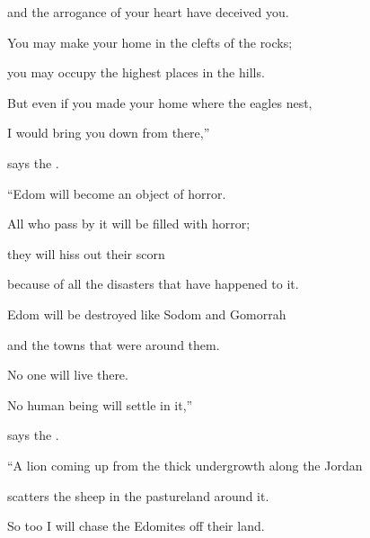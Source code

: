 {\par }{\Q and the arrogance
of your heart
have deceived
you.
\par }{\Q You may make your home
in the clefts
of the rocks;
\par }{\Q you may occupy
the highest
places in the hills.
\par }{\Q But even if
you made your home where the eagles
nest,
\par }{\Q I would bring
you down
from there,”
\par }{\Q says
the {}.
\par }{\Q {}“Edom
will become
an object of horror.
\par }{\Q All
who pass by
it will be filled with horror;
\par }{\Q they will hiss out their scorn
\par }{\Q because
of all
the disasters that have happened to it.
\par }{\Q {}Edom will be destroyed
like Sodom
and Gomorrah
\par }{\Q and the towns that were around them.
\par }{\Q No
one will live
there.
\par }{\Q No
human
being will settle
in it,”
\par }{\Q says
the {}.
\par }{\Q {}“A lion
coming up
from the thick undergrowth
along the Jordan
\par }{\Q scatters the sheep in the pastureland
around it.

\par }{\Q So too
I will chase
the Edomites off
their land.

}
